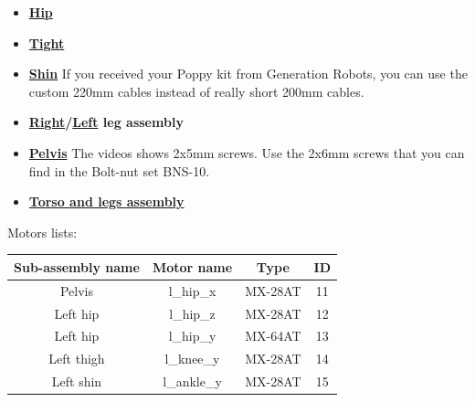 \documentclass[includefoot]{article}
\begin{document}
\begin{itemize}
\item \textbf{\href{https://github.com/poppy-project/Poppy-lightweight-biped-legs/blob/master/doc/subassemblies/left\_hip\_assembly\_instructions.md}{Hip}}
\item \textbf{\href{https://github.com/poppy-project/Poppy-lightweight-biped-legs/blob/master/doc/subassemblies/left\_thigh\_assembly\_instructions.md}{Tight}}
\item \textbf{\href{https://github.com/poppy-project/Poppy-lightweight-biped-legs/blob/master/doc/subassemblies/left\_shin\_assembly\_instructions.md}{Shin}} If you received your Poppy kit from Generation Robots, you can use the custom 220mm cables instead of really short 200mm cables.
\item \textbf{\href{https://github.com/poppy-project/Poppy-lightweight-biped-legs/blob/master/doc/subassemblies/right\_leg\_assembly\_instructions.md}{Right}/\href{https://github.com/poppy-project/Poppy-lightweight-biped-legs/blob/master/doc/subassemblies/left\_leg\_assembly\_instructions.md}{Left} leg assembly}
\item \textbf{\href{https://github.com/poppy-project/Poppy-lightweight-biped-legs/blob/master/doc/subassemblies/pelvis\_assembly\_instructions.md}{Pelvis}} The videos shows \diameter 2x5mm screws. Use the \diameter 2x6mm screws that you can find in the Bolt-nut set BNS-10.
\item \textbf{\href{https://github.com/poppy-project/poppy-humanoid/blob/master/hardware/doc/Poppy\_Humanoid\_assembly\_instructions.md}{Torso and legs assembly}}
\end{itemize}


Motors lists:

\begin{center}

\begin{tabular}{|c|c|c|c|}
\hline 
Sub-assembly name & Motor name & Type & ID \\ 
\hline 
Pelvis & l\_hip\_x & MX-28AT & 11 \\ 
\hline 
Left hip & l\_hip\_z & MX-28AT & 12 \\ 
\hline 
Left hip & l\_hip\_y & MX-64AT & 13 \\ 
\hline 
Left thigh & l\_knee\_y & MX-28AT & 14 \\ 
\hline 
Left shin & l\_ankle\_y & MX-28AT & 15\\
\hline 
\end{tabular} 
\end{center}
\end{document}
